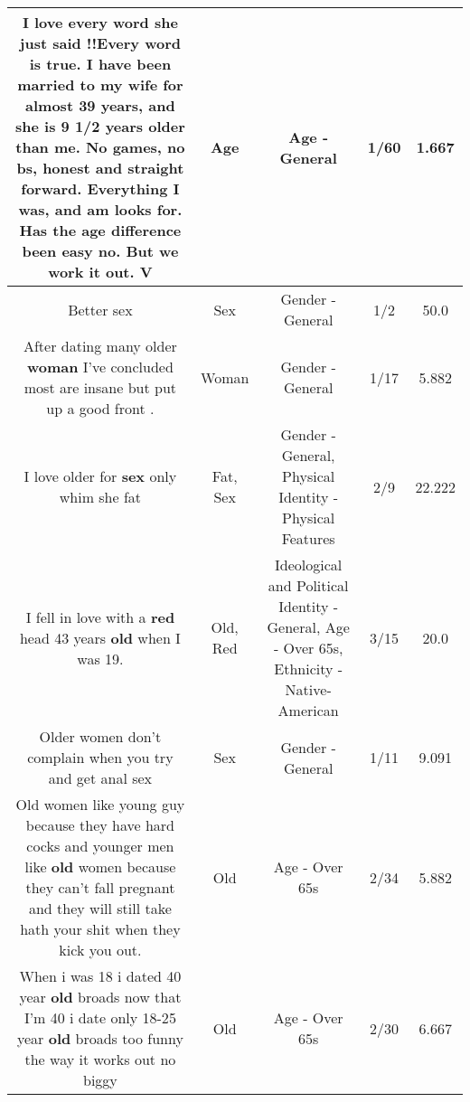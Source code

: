 \documentclass[11pt]{article}
\newlength\mylength
\begin{document}
\begin{center}
\begin{longtable}{|C{.65\mylength}|C{.30\mylength}|C{.12\mylength}|C{.12\mylength}|C{.12\mylength}|}
  \small I love every word she just said !!Every word is true. I have been married to my wife for almost 39 years, and she is 9 1/2 years older than me. No games, no bs, honest and straight forward. Everything I was, and am looks for.  Has the \textbf{age} difference been easy no. But we work it out.    V\normalsize   & Age & Age - General & 1/60 & 1.667 \\  \hline
  \small Better sex\normalsize   & Sex & Gender - General & 1/2 & 50.0 \\  \hline
  \small After dating many older \textbf{woman} I've concluded most are insane but  put up a good front .\normalsize   & Woman & Gender - General & 1/17 & 5.882 \\  \hline
  \small I love older for \textbf{sex} only whim she fat\normalsize   & Fat, Sex & Gender - General, Physical Identity - Physical Features & 2/9 & 22.222 \\  \hline
  \small I fell in love with a \textbf{r\textbf{ed}} head 43 years \textbf{old} when I was 19.\normalsize   & Old, Red &  Ideological and Political Identity - General, Age - Over 65s, Ethnicity - Native-American & 3/15 & 20.0 \\  \hline
  \small Older women don't complain when you try and get anal sex\normalsize   & Sex & Gender - General & 1/11 & 9.091 \\  \hline
  \small Old women like young guy because they have hard cocks and younger men like \textbf{old} women because they can't fall pregnant and they will still take hath your shit when they kick you out.\normalsize   & Old & Age - Over 65s & 2/34 & 5.882 \\  \hline
  \small When i was 18 i dated 40 year \textbf{old} broads now that I'm 40 i date only 18-25 year \textbf{old} broads too funny the way it works out no biggy\normalsize   & Old & Age - Over 65s & 2/30 & 6.667 \\  \hline

\end{longtable}
\end{center}
\end{document}
